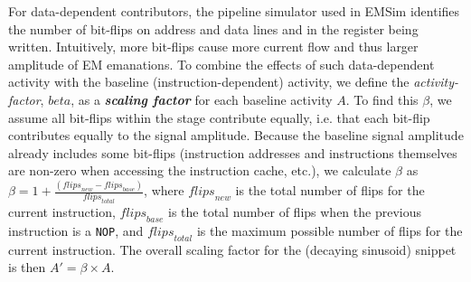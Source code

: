For data-dependent contributors, the pipeline simulator used in EMSim identifies the number of bit-flips on address and data lines and in the register being written. Intuitively, more bit-flips cause more current flow and thus larger amplitude of EM emanations. To combine the effects of such data-dependent activity with the baseline (instruction-dependent) activity, we define the \textit{activity-factor}, $beta$, as a \textbf{\textit{scaling factor}} for each baseline activity $A$. To find this $\beta$, we assume all bit-flips within the stage contribute equally, i.e. that each bit-flip contributes equally to the signal amplitude. Because the baseline signal amplitude already includes some bit-flips (instruction addresses and instructions themselves are non-zero when accessing the instruction cache, etc.), we calculate $\beta$ as $\beta = 1 + \frac{(\mathit{flips}_{new} - \mathit{flips}_{base})}{\mathit{flips}_{total}}$, where $\mathit{flips}_{new}$ is the total number of flips for the current instruction,  $\mathit{flips}_{base}$ is the total number of flips when the previous instruction is a {\tt NOP}, and $\mathit{flips}_{total}$ is the maximum possible number of flips for the current instruction. The overall scaling factor for the (decaying sinusoid) snippet is then $A' = \beta\times A$.

